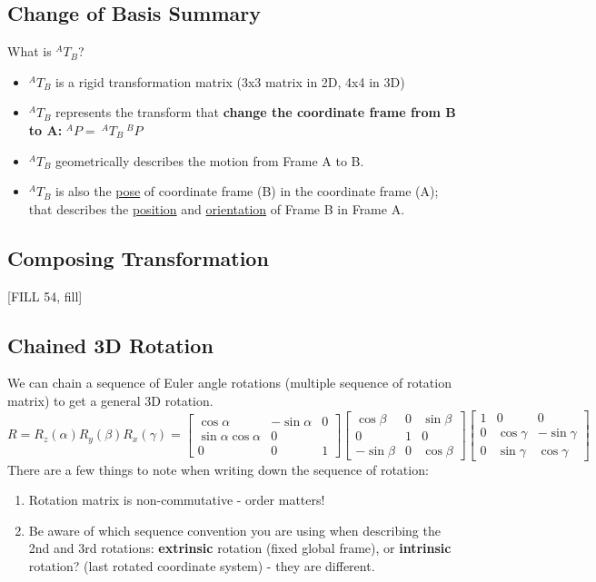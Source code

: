 \documentclass[10pt]{article}
\begin{document}
\subsection*{Change of Basis Summary}
What is $^A T_B$?
\begin{itemize}
	\item $^A T_B$ is a rigid transformation matrix (3x3 matrix in 2D, 4x4 in 3D)
	\item $^A T_B$ represents the transform that \textbf{change the coordinate frame from B to A:} $^A P = \:^A T_B \:^B P$
	\item $^A T_B$ geometrically describes the motion from Frame A to B.
	\item $^A T_B$ is also the \underline{pose} of coordinate frame (B) in the coordinate frame (A); that describes the \underline{position} and \underline{orientation} of Frame B in Frame A.
\end{itemize}

\subsection*{Composing Transformation}
[FILL 54, fill]

\subsection*{Chained 3D Rotation}
We can chain a sequence of Euler angle rotations (multiple sequence of rotation matrix) to get a general 3D rotation.
\[R = R_z(\alpha) R_y(\beta) R_x(\gamma) = \begin{bmatrix} \cos \alpha & -\sin \alpha & 0 \\ \sin \alpha \cos \alpha & 0 \\ 0 & 0 & 1 \end{bmatrix} \begin{bmatrix} \cos \beta & 0 & \sin \beta \\ 0 & 1 & 0 \\ -\sin \beta & 0 & \cos \beta \end{bmatrix} \begin{bmatrix} 1 & 0 & 0 \\ 0 & \cos \gamma & -\sin \gamma \\ 0 & \sin \gamma & \cos \gamma \end{bmatrix}\]
There are a few things to note when writing down the sequence of rotation:
\begin{enumerate}
    \item Rotation matrix is non-commutative - order matters!
    \item Be aware of which sequence convention you are using when describing the 2nd and 3rd rotations: \textbf{extrinsic} rotation (fixed global frame), or \textbf{intrinsic} rotation? (last rotated coordinate system) - they are different.
\end{enumerate}
\end{document}
